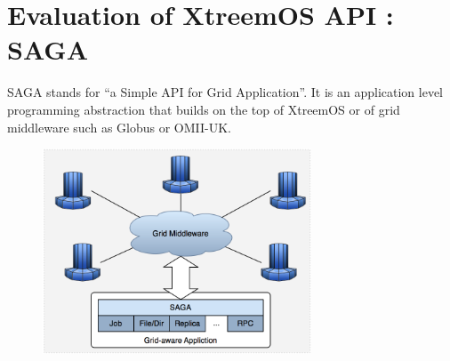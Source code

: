 
\section{Evaluation of XtreemOS API : SAGA}
 \label{sec:eval-api}






   

    SAGA stands for ``a Simple API for Grid Application''. It 
    is an application level programming abstraction that
    builds on the top of XtreemOS or of grid middleware such as Globus
    or OMII-UK. %
  
   \begin{figure}[h]
    \begin{center}
     \includegraphics[width=8cm]{figures/saga.png}
    \end{center}   
   \end{figure}


